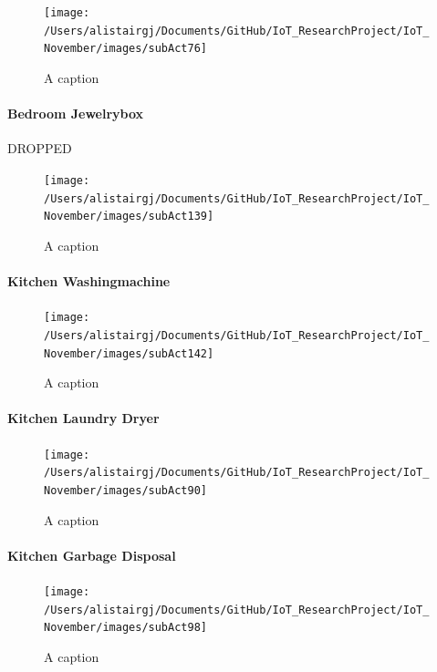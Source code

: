 \documentclass[11pt,]{article}
\let\oldparagraph\paragraph
\renewcommand{\paragraph}[1]{\oldparagraph{#1}\mbox{}}
\begin{document}
\begin{figure}[H]
\texttt{[image: /Users/alistairgj/Documents/GitHub/IoT\_ResearchProject/IoT\_November/images/subAct76]} \caption{A caption}\label{fig:subAct76}
\end{figure}

\hypertarget{bedroom-jewelrybox}{%
\paragraph{Bedroom Jewelrybox}\label{bedroom-jewelrybox}}

DROPPED

\begin{figure}[H]
\texttt{[image: /Users/alistairgj/Documents/GitHub/IoT\_ResearchProject/IoT\_November/images/subAct139]} \caption{A caption}\label{fig:subAct139}
\end{figure}

\hypertarget{kitchen-washingmachine}{%
\paragraph{Kitchen Washingmachine}\label{kitchen-washingmachine}}

\begin{figure}[H]
\texttt{[image: /Users/alistairgj/Documents/GitHub/IoT\_ResearchProject/IoT\_November/images/subAct142]} \caption{A caption}\label{fig:subAct142}
\end{figure}

\hypertarget{kitchen-laundry-dryer}{%
\paragraph{Kitchen Laundry Dryer}\label{kitchen-laundry-dryer}}

\begin{figure}[H]
\texttt{[image: /Users/alistairgj/Documents/GitHub/IoT\_ResearchProject/IoT\_November/images/subAct90]} \caption{A caption}\label{fig:subAct90}
\end{figure}

\hypertarget{kitchen-garbage-disposal}{%
\paragraph{Kitchen Garbage Disposal}\label{kitchen-garbage-disposal}}

\begin{figure}[H]
\texttt{[image: /Users/alistairgj/Documents/GitHub/IoT\_ResearchProject/IoT\_November/images/subAct98]} \caption{A caption}\label{fig:subAct98}
\end{figure}
\end{document}
